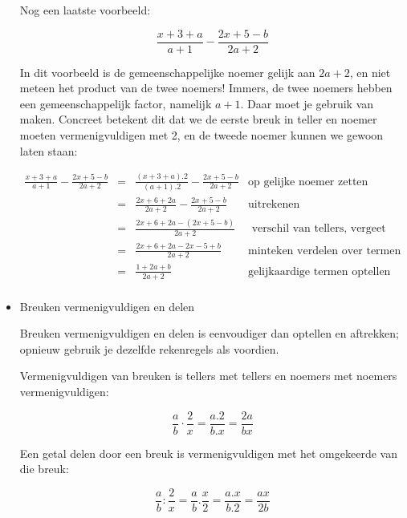 \begin{itemize}
	
	\noindent \medskip{}
	Nog een laatste voorbeeld:
	
	\begin{equation*}
	{\displaystyle \frac{x+3+a}{a+1}-\frac{2x+5-b}{2a+2}}
	\end{equation*}
	
	\noindent In dit voorbeeld is de gemeenschappelijke noemer gelijk
	aan $2a+2$, en niet meteen het product van de twee noemers! Immers,
	de twee noemers hebben een gemeenschappelijk factor, namelijk $a+1$.
	Daar moet je gebruik van maken. Concreet betekent dit dat we de eerste
	breuk in teller en noemer moeten vermenigvuldigen met 2, en de tweede
	noemer kunnen we gewoon laten staan:
	
	\begin{math}
	\begin{array}{ccl|r}
	{\displaystyle \frac{x+3+a}{a+1}-\frac{2x+5-b}{2a+2}} & = & {\displaystyle \frac{(x+3+a).2}{(a+1).2}-\frac{2x+5-b}{2a+2}}  & \text{op gelijke noemer zetten}\\
	& = & {\displaystyle \frac{2x+6+2a}{2a+2}-\frac{2x+5-b}{2a+2}} &\text{uitrekenen}\\
	& = & {\displaystyle \frac{2x+6+2a-(2x+5-b)}{2a+2}} & \text{ verschil van tellers, vergeet geen haken!}\\
	& = & {\displaystyle \frac{2x+6+2a-2x-5+b}{2a+2}} & \text{minteken verdelen over termen}\\
	& = & {\displaystyle \frac{1+2a+b}{2a+2}} & \text{gelijkaardige termen optellen}\\
	\end{array}
	\end{math}
	
	
	\item{Breuken vermenigvuldigen en delen}
	
	Breuken vermenigvuldigen en delen is eenvoudiger dan optellen en aftrekken;
	opnieuw gebruik je dezelfde rekenregels als voordien. 
	
	\noindent Vermenigvuldigen van breuken is tellers met tellers en noemers
	met noemers vermenigvuldigen:
	
	\begin{equation*}
		{\displaystyle \frac{a}{b}\cdot\frac{2}{x}=\frac{a.2}{b.x}=\frac{2a}{bx}} 
	\end{equation*}
	
	\noindent Een getal delen door een breuk is vermenigvuldigen met het
	omgekeerde van die breuk:
	
	\begin{equation*}
		{\displaystyle \frac{a}{b}:\frac{2}{x}=\frac{a}{b}.\frac{x}{2}=\frac{a.x}{b.2}=\frac{ax}{2b}}
	\end{equation*}	
	

\end{itemize}
